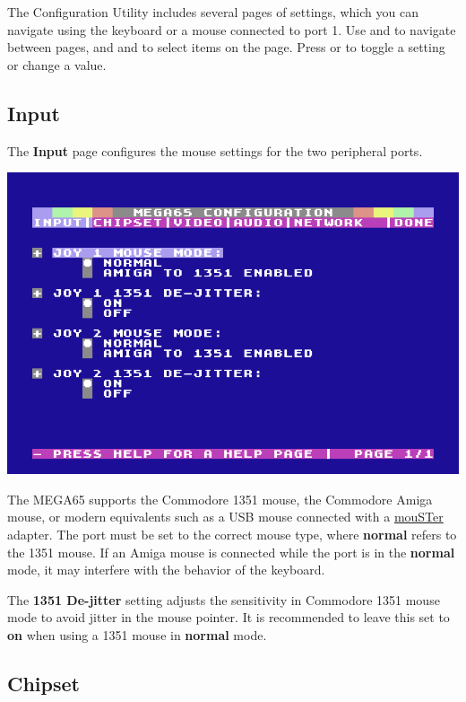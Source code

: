 The Configuration Utility includes several pages of settings, which you can navigate using the keyboard or a mouse connected to port 1. Use \megakey{$\leftarrow$} and \megakey{$\rightarrow$} to navigate between pages, and \megakey{$\uparrow$} and \megakey{$\downarrow$} to select items on the page. Press  or  to toggle a setting or change a value.

\subsection{Input}

The {\bf Input} page configures the mouse settings for the two peripheral ports.

\begin{center}
  \includegraphics[width=0.7\linewidth]{images/ss-m65config-1.png}
\end{center}

The MEGA65 supports the Commodore 1351 mouse, the Commodore Amiga mouse, or modern equivalents such as a USB mouse connected with a \href{https://retrohax.net/shop/amiga/mouster/}{mouSTer} adapter. The port must be set to the correct mouse type, where {\bf normal} refers to the 1351 mouse. If an Amiga mouse is connected while the port is in the {\bf normal} mode, it may interfere with the behavior of the keyboard.

The {\bf 1351 De-jitter} setting adjusts the sensitivity in Commodore 1351 mouse mode to avoid jitter in the mouse pointer. It is recommended to leave this set to {\bf on} when using a 1351 mouse in {\bf normal} mode.

\subsection{Chipset}

